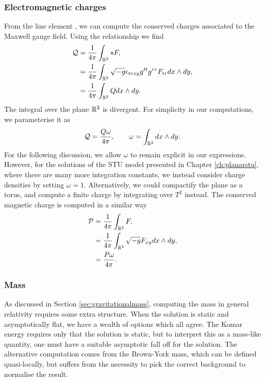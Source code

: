 \subsubsection*{Electromagnetic charges}
From the line element , we can compute the conserved charges associated to the Maxwell gauge field. Using the relationship  we find
\begin{equation*}
\begin{aligned}
\mathcal{Q} &= \frac{1}{4\pi} \int_{{\mathbb{R}}^2} \star F, \\
&= \frac{1}{4\pi} \int_{{\mathbb{R}}^2} \sqrt{-g} \epsilon_{trxy} g^{tt} g^{rr} F_{tr} dx \wedge dy, \\
&= \frac{1}{4\pi} \int_{{\mathbb{R}}^2} Q dx \wedge dy.
\end{aligned}
\end{equation*}
The integral over the plane ${\mathbb{R}}^2$ is divergent. For simplicity in our computations, we parameterise it as
\begin{equation}
\label{eq:pemcharge}
	\mathcal{Q} = \frac{Q \omega}{4\pi}, \qquad \omega = \int_{{\mathbb{R}}^2} dx \wedge dy.
\end{equation} 
For the following discussion, we allow $\omega$ to remain explicit in our expressions. However, for the solutions of the STU model presented in Chapter \ref{ch:planarstu}, where there are many more integration constants, we instead consider charge densities by setting $\omega = 1$. Alternatively, we could compactify the plane as a torus, and compute a finite charge by integrating over $T^2$ instead. The conserved magnetic charge is computed in a similar way
\begin{equation*}
\begin{aligned}
	\mathcal{P} &= \frac{1}{4\pi} \int_{{\mathbb{R}}^2} F, \\
	&= \frac{1}{4\pi} \int_{{\mathbb{R}}^2} \sqrt{-g} F_{xy} dx \wedge dy, \\
	&= \frac{P \omega}{4 \pi}.
\end{aligned}
\end{equation*}

\subsubsection*{Mass}

As discussed in Section \ref{sec:gravitationalmass}, computing the mass in general relativity requires some extra structure. When the solution is static and asymptotically flat, we have a wealth of options which all agree. The Komar energy requires only that the solution is static, but to interpret this as a mass-like quantity, one must have a suitable asymptotic fall off for the solution. The alternative computation comes from the Brown-York mass, which can be defined quasi-locally, but suffers from the necessity to pick the correct background to normalise the result. 

